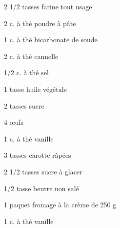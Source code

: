 %
%
%
%
%




\totaltime{}


\begin{ingredients}
    \item[] 
    \item 2 1/2 tasses farine tout usage
    \item 2 c. à thé poudre à pâte
    \item 1 c. à thé bicarbonate de soude
    \item 2 c. à thé cannelle
    \item 1/2 c. à thé sel
    \item 1 tasse huile végétale
    \item 2 tasses sucre
    \item 4 œufs
    \item 1 c. à thé vanille
    \item 3 tasses carotte râpées
    \\
    \item[] 
    \item 2 1/2 tasses sucre à glacer
    \item 1/2 tasse beurre non salé
    \item 1 paquet fromage à la crème de 250 g
    \item 1 c. à thé vanille
\end{ingredients}

